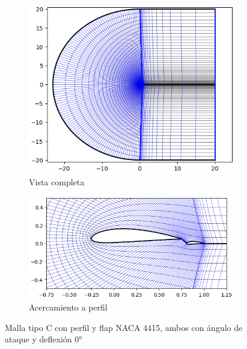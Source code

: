 \documentclass[letterpaper, openright, 12pt]{book}
\begin{document}
    \begin{figure}[htbp!]
        \centering
        \begin{subfigure}[c]{0.45\textwidth}
            \includegraphics[keepaspectratio,
                width=0.99\textwidth]{./img/naca4415_c_flap_far}
            \caption{Vista completa}
            \label{fig:naca4415_c_flap_far}
        \end{subfigure}
        \hfill
        \begin{subfigure}[c]{0.45\textwidth}
            \includegraphics[keepaspectratio,
                width=0.99\textwidth]{./img/naca4415_c_flap_close}
            \caption{Acercamiento a perfil}
            \label{fig:naca4415_c_flap_close}
        \end{subfigure}
        \caption[Malla tipo C con perfil y flap NACA4415]{Malla tipo C con
            perfil y flap NACA 4415, ambos con ángulo de ataque y deflexión
            $0\si{\degree}$}
    \end{figure}
\end{document}
